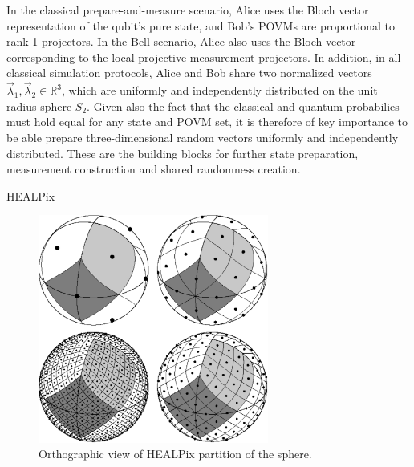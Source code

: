 In the classical prepare-and-measure scenario, Alice uses the Bloch vector representation of the qubit's pure state, and Bob's POVMs are proportional to rank-1 projectors. In the Bell scenario, Alice also uses the Bloch vector corresponding to the local projective measurement projectors. In addition, in all classical simulation protocols, Alice and Bob share two normalized vectors $\vec{\lambda}_1, \vec{\lambda}_2 \in \mathbb{R}^{3}$, which are uniformly and independently distributed on the unit radius sphere $S_2$. Given also the fact that the classical and quantum probabilies must hold equal for any state and POVM set, 
it is therefore of key importance to be able prepare three-dimensional random vectors uniformly and independently distributed. These are the building blocks for further state preparation, measurement construction and shared randomness creation.


HEALPix \cite{healpix}

\begin{figure}[!ht]
\begin{center}
\centerline{\includegraphics[height=7.5cm]{images/healpix4.pdf}}
\caption[Orthographic view of Healpix partition of the sphere]%
{\label{fig:healpix_sphere}%
Orthographic view of HEALPix partition of the sphere.}
\end{center}
\end{figure}

